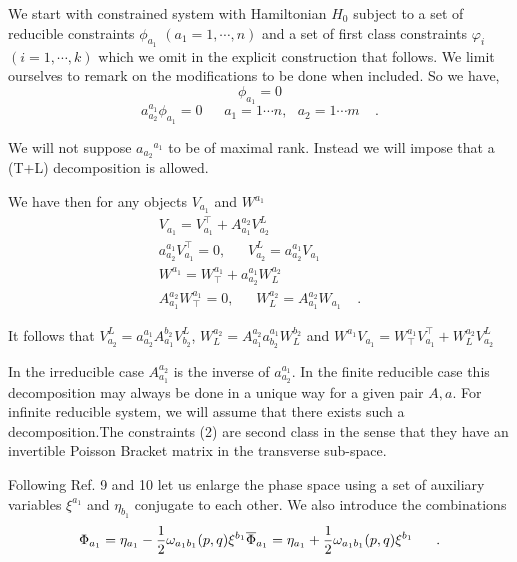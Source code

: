 \documentclass[a4paper,10pt]{article}
\begin{document}
We start with  constrained system with  Hamiltonian $H_0$
subject to a set of reducible constraints $\phi_{a_1}$  $(a_1 =1,\cdots ,n)$ and
a set of first class constraints  $\varphi_i$ $(i=1,\cdots ,k)$ which we omit in
the explicit construction that  follows. We limit ourselves to remark on the
modifications to be done when  included. So we have,
\begin{equation}
\label{1}
\phi_{a_1}=0
\end{equation}
\begin{equation}
\label{2}
a_{a_2}^{a_1}\phi_{a_1}=0\ \ \ \ \ \ \ a_1=1\cdots n,\ \ \ a_2=1\cdots m
\ \ \ \ \ .
\end{equation}


We will not suppose $a_{a_2}{}^{a_1}$ to be of maximal rank. Instead we will
impose that a (T+L) decomposition  is allowed.


We have then for any objects $V_{a_1}$ and $W^{a_1}$
\begin{eqnarray}
\label{3}
V_{a_1} =V^\top_{a_1}+A_{a_1}^{a_2}V_{a_2}^L\ \nonumber \\
a^{a_1}_{a_2}V_{a_1}^\top =0,\ \ \ \ \ \ \ V_{a_2}^L=a^{a_1}_{a_2}V_{a_1} \\
W^{a_1} =W_\top^{a_1}+a^{a_1}_{a_2}W_L^{a_2} \\
A^{a_2}_{a_1}W_\top^{a_1}=0,\ \ \ \ \ \ \ W_L^{a_2}=A^{a_2}_{a_1}W_{a_1}\ \ \ \ \ . \nonumber
\end{eqnarray}


It follows that $V_{a_2}^L = a^{a_1}_{a_2}A^{b_2}_{a_1}V_{b_2}^{L}$,
$W_L^{a_2}=A^{a_2}_{a_1}a^{a_1}_{b_2}W_L^{b_2}$ and $W^{a_1}V_{a_1} =W^{a_1}_\top
V_{a_1}^\top +W_L^{a_2} V^L_{a_2}$


In the irreducible case  $A^{a_2}_{a_1}$ is the inverse of $a_{a_2}^{a_1}$. In
the finite reducible case this  decomposition may always be done in a unique way
for a given pair $A,a$.  For infinite reducible
system, we will assume that there exists such a decomposition.The constraints
(2) are second class in the sense that they have an invertible  Poisson Bracket
matrix in the transverse sub-space.


Following Ref. 9 and 10 let us enlarge the phase space using a set of
auxiliary variables $\xi^{a_1}$ and $\eta_{b_1}$ conjugate to each other.
We also introduce the combinations
\begin{equation}
\label{4}
\Phi_{a_1} =\eta_{a_1}-{1\over{2}}\omega_{a_1b_1}(p,q)\xi^{b_1}\\
\overline{\Phi}_{a_1} =\eta_{a_1}+{1\over{2}}\omega_{a_1b_1}(p,q)\xi^{b_1}
\ \ \ \ \ .
\end{equation}
\end{document}
